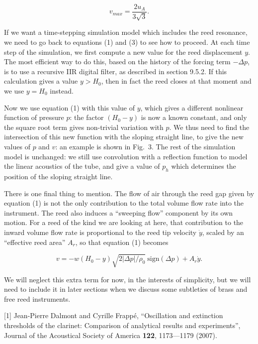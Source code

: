   $$v_{max}=\dfrac{2u_A}{3 \sqrt{3}} . \tag{13}$$ 

  If we want a time-stepping simulation model which includes the reed 
  resonance, we need to go back to equations (1) and (3) to see how to proceed. 
  At each time step of the simulation, we first compute a new value for the 
  reed displacement $y$. The most efficient way to do this, based on the 
  history of the forcing term $-\Delta p$, is to use a recursive IIR digital 
  filter, as described in section 9.5.2. If this calculation gives a value $y > 
  H_0$, then in fact the reed closes at that moment and we use $y=H_0$ instead. 

  Now we use equation (1) with this value of $y$, which gives a different 
  nonlinear function of pressure $p$: the factor $(H_0-y)$ is now a known 
  constant, and only the square root term gives non-trivial variation with $p$. 
  We thus need to find the intersection of this new function with the sloping 
  straight line, to give the new values of $p$ and $v$: an example is shown in 
  Fig.\ 3. The rest of the simulation model is unchanged: we still use 
  convolution with a reflection function to model the linear acoustics of the 
  tube, and give a value of $p_h$ which determines the position of the sloping 
  straight line. 


  There is one final thing to mention. The flow of air through the reed gap 
  given by equation (1) is not the only contribution to the total volume flow 
  rate into the instrument. The reed also induces a ``sweeping flow'' component 
  by its own motion. For a reed of the kind we are looking at here, that 
  contribution to the inward volume flow rate is proportional to the reed tip 
  velocity $\dot{y}$, scaled by an ``effective reed area'' $A_r$, so that 
  equation (1) becomes 

  $$v=-w(H_0-y) \sqrt{2 |\Delta p|/\rho_0} \mathrm{~sign} (\Delta p)+A_r 
  \dot{y} . \tag{14}$$ 

  We will neglect this extra term for now, in the interests of simplicity, but 
  we will need to include it in later sections when we discuss some subtleties 
  of brass and free reed instruments. 

  \sectionreferences{}[1] Jean-Pierre Dalmont and Cyrille Frappé, “Oscillation 
  and extinction thresholds of the clarinet: Comparison of analytical results 
  and experiments”, Journal of the Acoustical Society of America \textbf{122}, 
  1173—1179 (2007). 